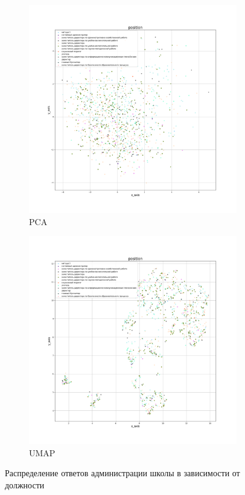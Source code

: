 \begin{figure}[H]
    \centering
    
    \begin{subfigure}{.5\textwidth}
      \centering
      \includegraphics[width=\linewidth]{../img/administration_PCA_position.png}
      \caption{PCA}
      \label{img::administration::position::PCA}
    \end{subfigure}%
    \begin{subfigure}{.5\textwidth}
      \centering
      \includegraphics[width=\linewidth]{../img/administration_UMAP_position.png}
      \caption{UMAP}
      \label{img::administration::position::UMAP}
    \end{subfigure}
    \caption{Распределение ответов администрации школы в зависимости от должности}
\end{figure}

